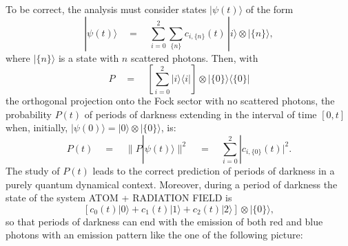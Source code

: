 \documentclass[12pt]{article}
\begin{document}
To be correct, the analysis  must consider states
$|\psi(t)\rangle$ of the form
\begin{equation}
|\psi(t)\rangle \quad = \quad \sum_{i=0}^{2} \sum_{\{ n \}} c_{i,
\{n\}}(t)\, |i\rangle \otimes |\{n\}\rangle,
\end{equation}
where $|\{n\}\rangle$ is a state with $n$ scattered photons. Then,
with
\begin{equation}
P \quad = \quad \left[ \sum_{i=0}^{2} |i\rangle\langle i|
\right]\otimes |\{0\}\rangle\langle\{0\}|
\end{equation}
the orthogonal projection onto the Fock sector with no scattered
photons, the probability $P(t)$ of periods of darkness extending
in the interval of time $[0, t]$ when, initially, $|\psi(0)\rangle
= |0\rangle\otimes |\{0\}\rangle$, is:
\begin{equation}
P(t) \quad = \quad \| P |\psi(t)\rangle \|^{2} \quad = \quad
\sum_{i=0}^{2} |c_{i, \{0\}}(t)|^{2}.
\end{equation}
The study of $P(t)$ leads to the correct prediction of periods of
darkness in a purely quantum dynamical context. Moreover, during a
period of darkness the state of the system ATOM + RADIATION FIELD
is
\begin{equation}
\left[ c_{0}(t) |0\rangle + c_{1}(t) |1\rangle + c_{2}(t)
|2\rangle \right] \otimes |\{0\}\rangle,
\end{equation}
so that periods of darkness can end with the emission of both red
and blue photons with an emission pattern like the one of the following
picture:
\end{document}
